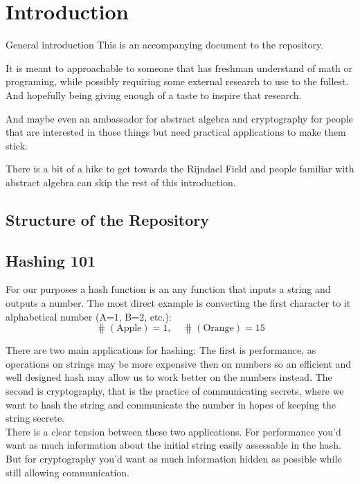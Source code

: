 
\chapter{Introduction}
General introduction
This is an accompanying document to the repository.

It is meant to approachable to someone that has freshman understand of math or programing,
while possibly requiring some external research to use to the fullest.
And hopefully being giving enough of a taste to inspire that research.

And maybe even an ambassador for abstract algebra and cryptography for people that are interested in those things but need practical applications to make them stick.

There is a bit of a hike to get towards the Rijndael Field and people familiar with abstract algebra can skip the rest of this introduction.

\section{Structure of the Repository}

\section{Hashing 101}
For our purposes a hash function is an any function that inputs a string and outputs a number.
The most direct example is converting the first character to it alphabetical number (A=$1$, B=$2$, etc.):
\[\hash(\text{Apple}) = 1,\quad \hash(\text{Orange}) = 15\]

There are two main applications for hashing:
The first is performance,
as operations on strings may be more expensive then on numbers so an efficient and well designed hash may allow us to work better on the numbers instead. 
The second is cryptography,
that is the practice of communicating secrets,
where we want to hash the string and communicate the number in hopes of keeping the string secrete.
\\

There is a clear tension between these two applications.
For performance you'd want as much information about the initial string easily assessable in the hash.
But for cryptography you'd want as much information hidden as possible while still allowing communication. 
\\

